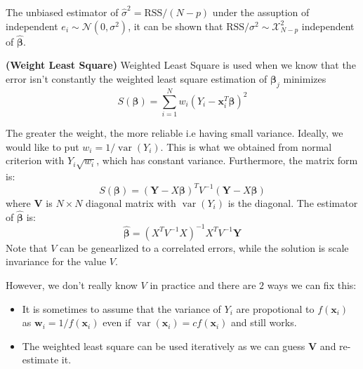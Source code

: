 \begin{remark}
    The unbiased estimator of $\hat{\sigma}^2 = \text{RSS}/(N-p)$ under the assuption of independent $e_i\sim\mathcal{N}(0, \sigma^2)$, it can be shown that $\text{RSS}/\sigma^2\sim\mathcal{X}^2_{N-p}$ independent of $\hat{\boldsymbol \beta}$. 
\end{remark}

\begin{definition}{\textbf{(Weight Least Square)}}
   Weighted Least Square is used when we know that the error isn't constantly the weighted least square estimation of $\boldsymbol \beta_j$ minimizes  
   \begin{equation*}
        S(\boldsymbol \beta) = \sum^N_{i=1}w_i(Y_i - \boldsymbol x_i^T\boldsymbol \beta)^2
   \end{equation*}
\end{definition}

\begin{remark}
   The greater the weight, the more reliable i.e having small variance. Ideally, we would like to put $w_i = 1/\operatorname{var}(Y_i)$. This is what we obtained from normal criterion with $Y_i\sqrt{w_i}$, which has constant variance. Furthermore, the matrix form is:
   \begin{equation*}
       S(\boldsymbol \beta) = (\boldsymbol Y - X\boldsymbol \beta)^TV^{-1}(\boldsymbol Y - X\boldsymbol \beta)
   \end{equation*} 
   where $\boldsymbol V$ is $N\times N$ diagonal matrix with $\operatorname{var}(Y_i)$ is the diagonal. The estimator of $\hat{\boldsymbol \beta}$ is:
   \begin{equation*}
        \hat{\boldsymbol \beta} = (X^TV^{-1}X)^{-1}X^TV^{-1}\boldsymbol Y
   \end{equation*}
   Note that $V$ can be genearlized to a correlated errors, while the solution is scale invariance for the value $V$. 
\end{remark}

\begin{remark}
    However, we don't really know $V$ in practice and there are $2$ ways we can fix this:
    \begin{itemize}
        \item It is sometimes to assume that the variance of $Y_i$ are propotional to $f(\boldsymbol x_i)$ as $\boldsymbol w_i = 1/f(\boldsymbol x_i)$ even if $\operatorname{var}(\boldsymbol x_i) = cf(\boldsymbol x_i)$ and still works. 
        \item The weighted least square can be used iteratively as we can guess $\boldsymbol V$ and re-estimate it. 
    \end{itemize}
\end{remark}

